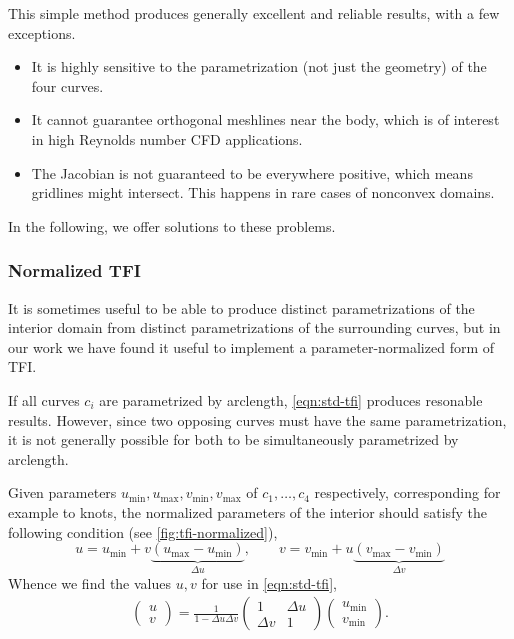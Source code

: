 \documentclass[3p,times,procedia]{elsarticle}
\begin{document}
This simple method produces generally excellent and reliable results, with a few
exceptions.
\begin{itemize}
\item It is highly sensitive to the parametrization (not just the geometry) of
  the four curves.
\item It cannot guarantee orthogonal meshlines near the body, which is of
  interest in high Reynolds number CFD applications.
\item The Jacobian is not guaranteed to be everywhere positive, which means
  gridlines might intersect. This happens in rare cases of nonconvex domains.
\end{itemize}
In the following, we offer solutions to these problems.

\subsubsection{Normalized TFI}

It is sometimes useful to be able to produce distinct parametrizations of the
interior domain from distinct parametrizations of the surrounding curves, but in
our work we have found it useful to implement a parameter-normalized form of
TFI.

If all curves $c_i$ are parametrized by arclength, \eqref{eqn:std-tfi} produces
resonable results. However, since two opposing curves must have the same
parametrization, it is not generally possible for both to be simultaneously
parametrized by arclength.

Given parameters $u_\text{min}, u_\text{max}, v_\text{min}, v_\text{max}$ of
$c_1,\ldots, c_4$ respectively, corresponding for example to knots, the
normalized parameters of the interior should satisfy the following condition
(see \autoref{fig:tfi-normalized}),
\[
  u = u_\text{min} + v\underbrace{(u_\text{max} - u_\text{min})}_{\Delta u}, \qquad
  v = v_\text{min} + u\underbrace{(v_\text{max} - v_\text{min})}_{\Delta v}
\]
Whence we find the values $u, v$ for use in \eqref{eqn:std-tfi},
\begin{align*}
  \begin{pmatrix} u \\ v \end{pmatrix} =
  \frac{1}{1-\Delta u\Delta v}
  \begin{pmatrix} 1 & \Delta u \\ \Delta v & 1 \end{pmatrix}
  \begin{pmatrix} u_\text{min} \\ v_\text{min} \end{pmatrix}.
\end{align*}
\end{document}
